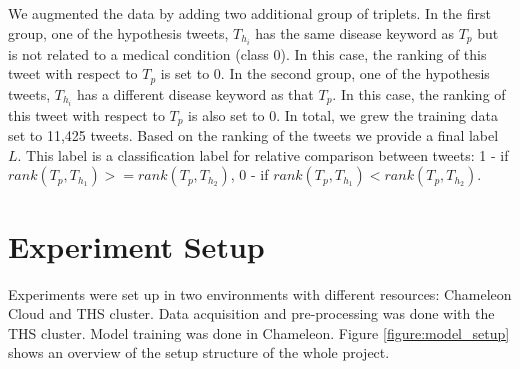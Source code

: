 \documentclass[12pt]{report}
\begin{document}
We  augmented the data  by adding two additional group of triplets.  In the first group, one of the 
hypothesis tweets, $T_{h_i}$ has the same disease keyword as $T_p$ but is not related to a medical condition (class 0). In this case, the 
ranking of this tweet with respect to $T_p$ is set to 0. In the second group, one of the 
hypothesis tweets, $T_{h_i}$ has a different disease keyword as that $T_p$.  In this case, the 
ranking of this tweet with respect to $T_p$ is also set to 0. In total, we grew the training data set to 11,425 tweets. 
Based on the ranking of the tweets we provide a final label $L$. This label is a classification label for relative comparison between tweets: 1 - if $rank(T_p, T_{h_1}) >= rank(T_p, T_{h_2})$, 0 - if  $rank(T_p, T_{h_1}) < rank(T_p, T_{h_2})$.


\section{Experiment Setup}
Experiments were set up in two environments with different resources: Chameleon Cloud and \ac{THS} cluster. Data acquisition and pre-processing was done
with the \ac{THS} cluster. Model training was done in Chameleon. 
Figure \ref{figure:model_setup} shows an overview of the setup structure of the whole project.
\end{document}

